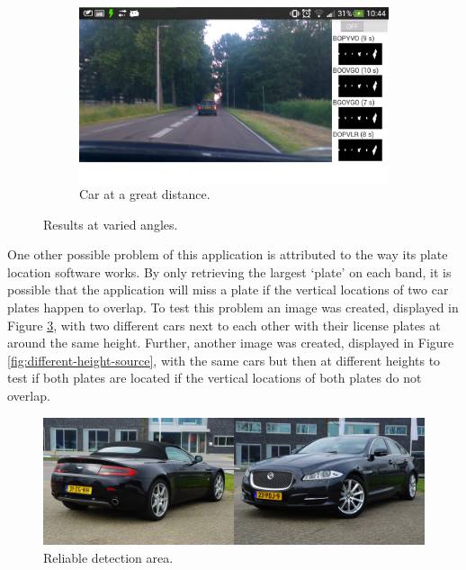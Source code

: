 \begin{figure}[ht]
        \begin{subfigure}{0.50\textwidth}
            \includegraphics[width=\textwidth]{plaatjes/real-scenario-3}
            \caption{Car at a great distance.}
            \label{fig:real-scenario-3}
        \end{subfigure}%

        \caption{Results at varied angles.}
        \label{fig:real-scenario}
\end{figure}%

\clearpage


One other possible problem of this application is attributed to the way its plate location software works. By only retrieving the largest `plate' on each band, it is possible that the application will miss a plate if the vertical locations of two car plates happen to overlap. To test this problem an image was created, displayed in Figure \ref{fig:same-height-source}, with two different cars next to each other with their license plates at around the same height. Further, another image was created, displayed in Figure \ref{fig:different-height-source}, with the same cars but then at different heights to test if both plates are located if the vertical locations of both plates do not overlap.

\begin{figure}[ht]
    \centering
    \includegraphics[width=\textwidth]{plaatjes/85}
    \caption{Reliable detection area.}
    \label{fig:same-height-source}
\end{figure}%

